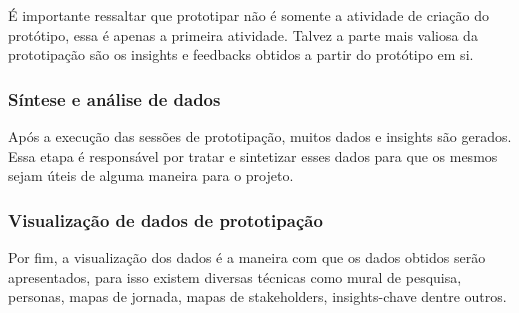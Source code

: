 É importante ressaltar que prototipar não é somente a atividade de criação do protótipo, essa é apenas a primeira atividade. Talvez a parte mais valiosa da prototipação são os insights e feedbacks obtidos a partir do protótipo em si.

\subsubsection{Síntese e análise de dados}

Após a execução das sessões de prototipação, muitos dados e insights são gerados. Essa etapa é responsável por tratar e sintetizar esses dados para que os mesmos sejam úteis de alguma maneira para o projeto.

\subsubsection{Visualização de dados de prototipação}

Por fim, a visualização dos dados é a maneira com que os dados obtidos serão apresentados, para isso existem diversas técnicas como mural de pesquisa, personas, mapas de jornada, mapas de stakeholders, insights-chave dentre outros.



